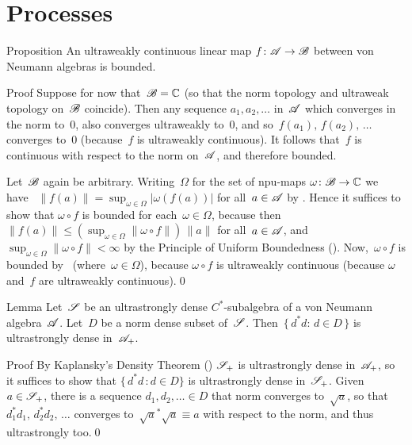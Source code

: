 \documentclass[a]{subfiles}
\begin{document}
\chapter{Processes}
\begin{parsec}%
\begin{point}{Proposition}%
An ultraweakly continuous linear map $f\colon \mathscr{A}\to\mathscr{B}$
between von Neumann algebras is bounded.
\begin{point}{Proof}%
Suppose for now that~$\mathscr{B}=\mathbb{C}$
(so that the norm topology and ultraweak topology on~$\mathscr{B}$ coincide).
Then any sequence $a_1,a_2,\dotsc$
in~$\mathscr{A}$ which converges in the norm to~$0$,
also converges ultraweakly to~$0$,
and so~$f(a_1),\,f(a_2),\,\dotsc$ converges
to~$0$ (because~$f$ is ultraweakly continuous).
It follows that~$f$ is continuous with respect to the norm
on~$\mathscr{A}$, and therefore bounded.
\begin{point}%
Let~$\mathscr{B}$ again be arbitrary.
Writing~$\Omega$ for the set of npu-maps $\omega\colon \mathscr{B}\to\mathbb{C}$
we have~
$\|f(a)\|=\sup_{\omega\in\Omega} \left|\omega(f(a))\right|$
for all~$a\in\mathscr{A}$
by \TODO{}.
Hence it suffices to show that $\omega\circ f$
is bounded for each~$\omega\in\Omega$,
because then $\|f(a)\|\leq (\sup_{\omega\in\Omega}\|\omega\circ f\|)\,\|a\|$
for all~$a\in \mathscr{A}$,
and~$\sup_{\omega\in \Omega} \|\omega\circ f\|<\infty$
by the Principle of Uniform Boundedness ().
Now,~$\omega\circ f$ is bounded by~ 
(where~$\omega\in\Omega$),
because $\omega\circ f$ is ultraweakly continuous
(because $\omega$ and~$f$ are ultraweakly continuous).\qed
\end{point}
\end{point}
\end{point}
\begin{point}{Lemma}%
Let~$\mathscr{S}$ be an ultrastrongly dense $C^*$-subalgebra
of a von Neumann algebra~$\mathscr{A}$.
Let~$D$ be a norm dense subset of~$\mathscr{S}$.
Then~$\{\,d^*d\colon\,d\in D\,\}$
is ultrastrongly dense in~$\mathscr{A}_{+}$.
\begin{point}{Proof}%
By Kaplansky's Density Theorem ()
$\mathscr{S}_{+}$ 
is ultrastrongly dense in~$\mathscr{A}_{+}$,
so it suffices to show that $\{\, d^*d\,\colon d\in D\}$
is ultrastrongly dense in~$\mathscr{S}_{+}$.
Given~$a\in \mathscr{S}_{+}$,
there is a sequence $d_1,d_2,\dotsc \in D$
that norm converges to~$\sqrt{a}$,
so that~$d_1^*d_1,\,d_2^*d_2,\,\dotsc$
converges to~$\sqrt{a}^*\sqrt{a}\equiv a$
with respect to the norm, and thus ultrastrongly too.\qed
\end{point}
\end{point}
\end{parsec}%
\end{document}
